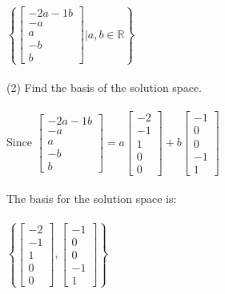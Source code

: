 \documentclass{article}
\begin{document}
$\left\{ \left[ 
\begin{matrix} -2a - 1b \\ -a \\ a \\ -b \\ b \end{matrix} 
\right] \Bigg|  a,b \in \mathbb{R} \right\}$\\
\\
(2) Find the basis of the solution space.\\
\\
Since
$\left[ 
\begin{matrix} -2a - 1b \\ -a \\ a \\ -b \\ b \end{matrix} 
\right] = a\left[ 
\begin{matrix} -2 \\ -1 \\ 1 \\ 0 \\ 0 \end{matrix} 
\right] + b\left[ 
\begin{matrix} -1 \\ 0 \\ 0 \\ -1 \\ 1 \end{matrix} 
\right]$ \\
\\
The basis for the solution space is:\\
\\
$\left\{
\left[\begin{matrix} -2 \\ -1 \\ 1 \\ 0 \\ 0 \end{matrix} \right],
\left[\begin{matrix} -1 \\ 0 \\ 0 \\ -1 \\ 1 \end{matrix}\right] \right\}$\\
\end{document}
